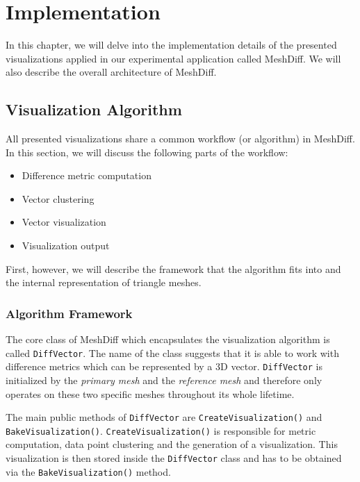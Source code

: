 \chapter{Implementation}

In this chapter, we will delve into the implementation details of the presented visualizations applied in our experimental application called MeshDiff. We will also describe the overall architecture of MeshDiff.

\section{Visualization Algorithm}
\label{sec:implementation_algorithm}

All presented visualizations share a common workflow (or algorithm) in MeshDiff. In this section, we will discuss the following parts of the workflow:

\begin{itemize}
\item Difference metric computation
\item Vector clustering
\item Vector visualization
\item Visualization output
\end{itemize}

First, however, we will describe the framework that the algorithm fits into and the internal representation of triangle meshes.

\subsection{Algorithm Framework}
\label{sec:implementation-framework}

The core class of MeshDiff which encapsulates the visualization algorithm is called \verb+DiffVector+. The name of the class suggests that it is able to work with difference metrics which can be represented by a 3D vector. \verb+DiffVector+ is initialized by the {\it primary mesh} and the {\it reference mesh} and therefore only operates on these two specific meshes throughout its whole lifetime.

The main public methods of \verb+DiffVector+ are \verb+CreateVisualization()+ and \verb+BakeVisualization()+. \verb+CreateVisualization()+ is responsible for metric computation, data point clustering and the generation of a visualization. This visualization is then stored inside the \verb+DiffVector+ class and has to be obtained via the \verb+BakeVisualization()+ method.

